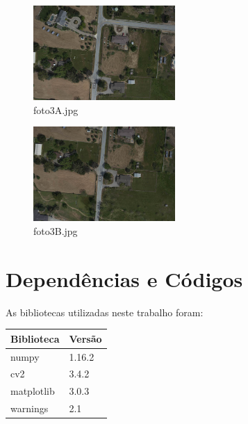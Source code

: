 \documentclass[twoside,twocolumn]{article}
\begin{document}
\begin{figure}[H]
\begin{center}
	\includegraphics[height=3.6cm]{figures/foto3A.jpg}
\caption{foto3A.jpg} \label{foto3A}
\end{center}
\end{figure}

\begin{figure}[H]
\begin{center}
	\includegraphics[height=3.6cm]{figures/foto3B.jpg}
\caption{foto3B.jpg} \label{foto3B}
\end{center}
\end{figure}


\section{Dependências e Códigos}

As bibliotecas utilizadas neste trabalho foram:

\begin{table}[H]
\begin{center}
\begin{tabular}{|l|l|}
\hline
\textbf{Biblioteca} & \textbf{Versão} \\ \hline
numpy               & 1.16.2          \\ \hline
cv2                 & 3.4.2           \\ \hline
matplotlib          & 3.0.3           \\ \hline
warnings            & 2.1             \\ \hline
\end{tabular}
\end{center}
\end{table}
\end{document}

